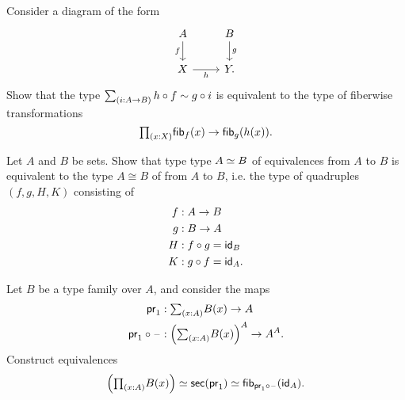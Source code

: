 \begin{exercises}
\begin{subexenum}
\end{subexenum}
\item \label{ex:sq_fib}Consider a diagram of the form
\begin{equation*}
\begin{tikzcd}
A \arrow[d,swap,"f"] & B \arrow[d,"g"] \\
X \arrow[r,swap,"h"] & Y.
\end{tikzcd}
\end{equation*}
Show that the type $\sm{i:A\to B}h\circ f\htpy g\circ i$ is equivalent to the type of fiberwise transformations
\begin{equation*}
\prd{x:X}\fib{f}{x}\to\fib{g}{h(x)}.
\end{equation*}
\item \label{ex:iso_equiv}Let $A$ and $B$ be sets. Show that type type $\eqv{A}{B}$ of equivalences from $A$ to $B$ is equivalent to the type $A\cong B$ of  from $A$ to $B$, i.e. the type of quadruples $(f,g,H,K)$ consisting of
\begin{align*}
f & : A\to B \\
g & : B\to A \\
H & : f\circ g = \idfunc[B] \\
K & : g\circ f = \idfunc[A].
\end{align*}
\item \label{ex:pi_sec}Let $B$ be a type family over $A$, and consider the maps
  \begin{align*}
    \proj 1 & : \sm{x:A} B(x)\to A \\
    \proj1 \circ \blank & : \Big(\sm{x:A} B(x)\Big)^A \to A^A.
  \end{align*}
  Construct equivalences
  \begin{equation*}
    \Big(\prd{x:A}B(x)\Big) \eqvsym \mathsf{sec}(\proj 1) \eqvsym \fib{\proj 1 \circ\blank}{\idfunc[A]}.
  \end{equation*}
\end{exercises}
